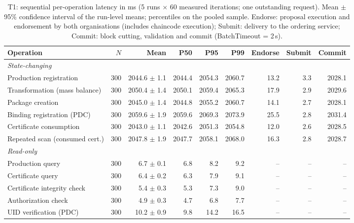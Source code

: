 \begin{table}[t]
\centering\small
\caption{T1: sequential per-operation latency in ms (5 runs $\times$ 60 measured iterations; one outstanding request). Mean $\pm$ 95\% confidence interval of the run-level means; percentiles on the pooled sample. Endorse: proposal execution and endorsement by both organisations (includes chaincode execution); Submit: delivery to the ordering service; Commit: block cutting, validation and commit (BatchTimeout = 2\,s).}
\label{tab:t1-latency}
\setlength{\tabcolsep}{3.5pt}
\begin{tabular}{lrrrrrrrr}
\toprule
Operation & $N$ & Mean & P50 & P95 & P99 & Endorse & Submit & Commit \\
\midrule
\multicolumn{9}{l}{\emph{State-changing}} \\
Production registration & 300 & 2044.6 $\pm$ 1.1 & 2044.4 & 2054.3 & 2060.7 & 13.2 & 3.3 & 2028.1 \\
Transformation (mass balance) & 300 & 2050.4 $\pm$ 1.4 & 2050.1 & 2059.4 & 2065.3 & 17.9 & 2.9 & 2029.6 \\
Package creation & 300 & 2045.0 $\pm$ 1.4 & 2044.8 & 2055.2 & 2060.7 & 14.1 & 2.7 & 2028.1 \\
Binding registration (PDC) & 300 & 2059.6 $\pm$ 1.9 & 2059.6 & 2069.3 & 2073.9 & 25.5 & 2.8 & 2031.4 \\
Certificate consumption & 300 & 2043.0 $\pm$ 1.1 & 2042.6 & 2051.3 & 2054.8 & 12.0 & 2.6 & 2028.5 \\
Repeated scan (consumed cert.) & 300 & 2047.8 $\pm$ 1.9 & 2047.7 & 2058.1 & 2068.0 & 16.3 & 2.8 & 2028.7 \\
\midrule
\multicolumn{9}{l}{\emph{Read-only}} \\
Production query & 300 & 6.7 $\pm$ 0.1 & 6.8 & 8.2 & 9.2 & -- & -- & -- \\
Certificate query & 300 & 6.4 $\pm$ 0.2 & 6.3 & 7.9 & 9.1 & -- & -- & -- \\
Certificate integrity check & 300 & 5.4 $\pm$ 0.3 & 5.3 & 7.3 & 9.0 & -- & -- & -- \\
Authorization check & 300 & 4.9 $\pm$ 0.3 & 4.7 & 6.8 & 7.7 & -- & -- & -- \\
UID verification (PDC) & 300 & 10.2 $\pm$ 0.9 & 9.8 & 14.2 & 16.5 & -- & -- & -- \\
\bottomrule
\end{tabular}
\end{table}
